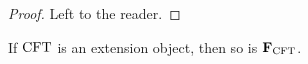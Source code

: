 \begin{proof}
Left to the reader.
\end{proof}
\begin{comment}
\begin{proof}
It is straightforward to verify the equalities
\begin{align*}
\pullbackpr{1}{\ectxext}{\eft}\circ\beta_2\circ\eext{3}
  & = \beta_1\circ\eft[3]\circ\eft[4]
  \\
\pullbackpr{1}{\ectxext}{\eft}\circ\eext{2}\circ\beta_3
  & = \beta_1\circ\eft[3]\circ\eft[4].
\end{align*}
Thus, it remains to verify that
\begin{equation*}
\pullbackpr{2}{\ectxext}{\eft}\circ\beta_2\circ\eext{3}
  = \pullbackpr{2}{\ectxext}{\eft}\circ\eext{2}\circ\beta_3.
\end{equation*}
It is straightforward to see that the diagram
\begin{equation*}
\begin{tikzcd}[column sep=large]
\stesysf_4
  \ar{dd}[swap]{\pullback{\pullbackpr{2}{\efamext}{\eft[2]}}{\pullbackpr{2}{\efamext}{\eft[2]}}{\efamext}{\eft[2]}}
  \ar{r}{\eext{3}}
  &
\stesysf_3
  \ar{r}{\beta_2}
  \ar{d}[swap]{\pullbackpr{2}{\efamext}{\eft[2]}}
  &
\stesysf_2
  \ar{dd}{\pullbackpr{2}{\ectxext}{\eft}}
  \\
  {} &
\stesysf_2
  \ar{dr}{\beta_1}
  \\
\stesysf_3
  \ar{ur}{\eext{2}}
  \ar{r}[swap]{\beta_2}
  &
\stesysf_2
  \ar{r}[swap]{\efamext}
  &
\stesysf
\end{tikzcd}
\end{equation*}
commutes. It is likewise straightforward to see that the diagram
\begin{equation*}
\begin{tikzcd}
\stesysf_4
  \ar{r}{\beta_3}
  \ar{d}[swap]{\pullback{\pullbackpr{2}{\efamext}{\eft[2]}}{\pullbackpr{2}{\efamext}{\eft[2]}}{\efamext}{\eft[2]}}
  &
\stesysf_3
  \ar{r}{\eext{2}}
  \ar{d}[swap]{\beta_2}
  &
\stesysf_2
  \ar{d}{\pullbackpr{2}{\ectxext}{\eft}}
  \\
\stesysf_3
  \ar{r}[swap]{\beta_2}
  &
\stesysf_2
  \ar{r}[swap]{\efamext}
  &
\stesysf
\end{tikzcd}
\end{equation*}
commutes, completing our goal.
\end{proof}
\end{comment}

\begin{thm}\label{famextobj}
If $\mathrm{CFT}$ is an extension object, then so is $\mathbf{F}_{\mathrm{CFT}}$.
\end{thm}

